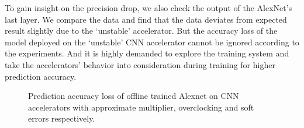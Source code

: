   To gain insight on the precision drop, we also check the output of the AlexNet’s last 
layer. We compare the data and find that the data deviates from expected result slightly 
due to the ‘unstable’ accelerator. But the accuracy loss of the model deployed on 
the ‘unstable’ CNN accelerator cannot be ignored according to the experiments. 
And it is highly demanded to explore the training 
system and take the accelerators’ behavior into consideration during training for higher prediction accuracy.

\begin{figure}
    \caption{Prediction accuracy loss of offline trained Alexnet on CNN accelerators with approximate multiplier, overclocking and soft errors respectively.}
\label{fig:loss}
\vspace{-1em}
\end{figure}



